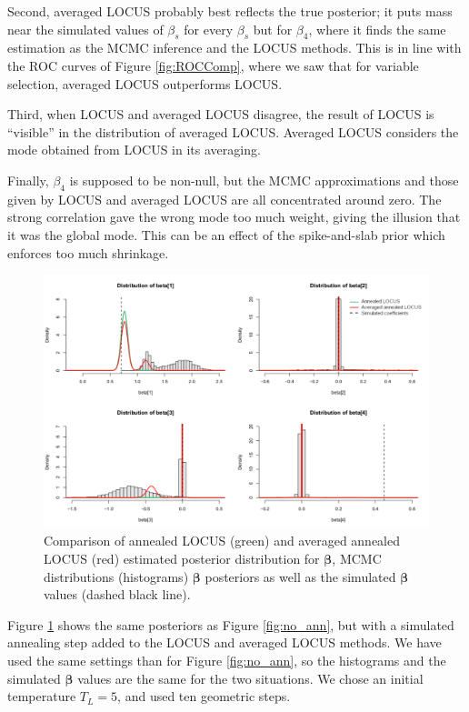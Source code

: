 \documentclass[a4paper, 11pt]{report}
\numberwithin{equation}{chapter}
\begin{document}
Second, averaged LOCUS probably best reflects the true posterior; it puts mass near the simulated values of $\beta_s$ for every $\beta_s$ but for $\beta_4$, where it finds the same estimation as the MCMC inference and the LOCUS methods. This is in line with the ROC curves of Figure \ref{fig:ROCComp}, where we saw that for variable selection, averaged LOCUS outperforms LOCUS.

Third, when LOCUS and averaged LOCUS disagree, the result of LOCUS is ``visible'' in the distribution of averaged LOCUS. Averaged LOCUS considers the mode obtained from LOCUS in its averaging.

Finally, $\beta_4$ is supposed to be non-null, but the MCMC approximations and those given by LOCUS and averaged LOCUS are all concentrated around zero. The strong correlation gave the wrong mode too much weight, giving the illusion that it was the global mode. This can be an effect of the spike-and-slab prior which enforces too much shrinkage.

\begin{figure}[h]
\centering
\includegraphics[width=\textwidth, bb=0 0 800px 600px]{images/annealing.pdf}
\caption{\label{fig:ann}Comparison of annealed LOCUS (green) and averaged annealed LOCUS (red) estimated posterior distribution for $\boldsymbol{\beta}$, MCMC distributions (histograms) $\boldsymbol{\beta}$ posteriors as well as the simulated $\boldsymbol{\beta}$ values (dashed black line).}
\end{figure}
Figure \ref{fig:ann} shows the same posteriors as Figure \ref{fig:no_ann}, but with a simulated annealing step added to the LOCUS and averaged LOCUS methods. We have used the same settings than for Figure \ref{fig:no_ann}, so the histograms and the simulated $
\boldsymbol{\beta}$ values are the same for the two situations. We chose an initial temperature $T_L = 5$, and used ten geometric steps.
\end{document}
